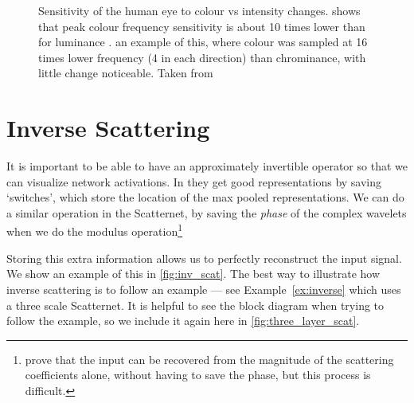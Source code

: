   \begin{figure}
    \centering
      \newline
      \caption[Sensitivity of the human eye to colour vs intensity changes]
              {Sensitivity of the human eye to colour vs intensity changes.
               shows that peak colour frequency
              sensitivity is about 10 times lower than for luminance \cite{mullen_contrast_1985}.
               an example of this, where colour was
              sampled at 16 times lower frequency (4 in each direction) than 
              chrominance, with little change noticeable. Taken from
              \cite{nick_kingsbury_4f8_2015}}
      \label{fig:colour_vision}
  \end{figure}


\section{Inverse Scattering}
  It is important to be able to have an approximately
  invertible operator so that we can visualize network activations. In
  \citep{zeiler_visualizing_compact_2014} they get good representations by
  saving `switches', which store the location of the max pooled
  representations. We can do a similar operation in the Scatternet, by saving
  the \emph{phase} of the complex wavelets when we do the modulus
  operation\footnote{\citep{waldspurger_phase_2012} prove that the input can be
  recovered from the magnitude of the scattering coefficients alone, without
  having to save the phase, but this process is difficult.}
  
  Storing this extra information allows us to perfectly reconstruct the input
  signal. We show an example of this in \autoref{fig:inv_scat}. The best way to
  illustrate how inverse scattering is to follow an example --- see 
  Example~\ref{ex:inverse} which uses a three
  scale Scatternet. It is helpful to see the block diagram when trying to
  follow the example, so we include it again here in
  \autoref{fig:three_layer_scat}.

